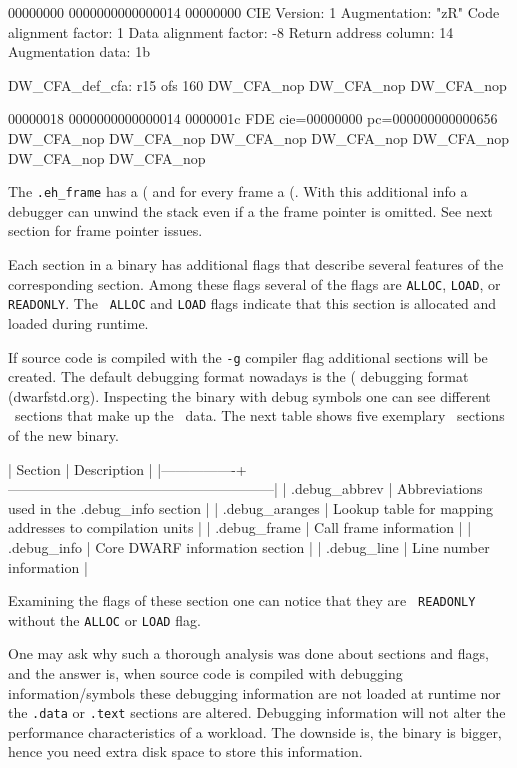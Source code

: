 00000000 0000000000000014 00000000 CIE
  Version:               1
  Augmentation:          "zR"
  Code alignment factor: 1
  Data alignment factor: -8
  Return address column: 14
  Augmentation data:     1b

  DW_CFA_def_cfa: r15 ofs 160
  DW_CFA_nop
  DW_CFA_nop
  DW_CFA_nop

00000018 0000000000000014 0000001c FDE cie=00000000 pc=000000000000656
  DW_CFA_nop
  DW_CFA_nop
  DW_CFA_nop
  DW_CFA_nop
  DW_CFA_nop
  DW_CFA_nop
  DW_CFA_nop
\stoptyping

The { \tt .eh_frame} has a  (\CIE\) and for every frame a
 (\FDE\). With this additional info a debugger can unwind
the stack even if a the frame pointer is omitted. See next section for
frame pointer issues.

Each section in a binary has additional flags that describe several
features of the corresponding section. Among these flags several of
the flags are {\tt ALLOC}, {\tt LOAD}, or {\tt READONLY}. The {\tt
  ALLOC} and {\tt LOAD} flags indicate that this section is allocated
and loaded during runtime.

If source code is compiled with the {\tt -g} compiler flag additional
sections will be created. The default debugging format nowadays is the
 (\DWARF\) debugging format (dwarfstd.org). Inspecting
the binary with debug symbols one can see different \DWARF\ sections
that make up the \DWARF\ data. The next table shows five exemplary
\DWARF\ sections of the new binary.

\starttyping
| Section        | Description                                             |
|----------------+---------------------------------------------------------|
| .debug_abbrev  | Abbreviations used in the .debug_info section           |
| .debug_aranges | Lookup table for mapping addresses to compilation units |
| .debug_frame   | Call frame information                                  |
| .debug_info    | Core DWARF information section                          |
| .debug_line    | Line number information                                 |
\stoptyping

Examining the flags of these section one can notice that they are {\tt
  READONLY} without the {\tt ALLOC} or {\tt LOAD} flag.

One may ask why such a thorough analysis was done about sections and
flags, and the answer is, when source code is compiled with debugging
information/symbols these debugging information are not loaded at
runtime nor the {\tt .data} or {\tt .text} sections are altered. Debugging
information will not alter the performance characteristics of a
workload. The downside is, the binary is bigger, hence you need extra
disk space to store this information.

